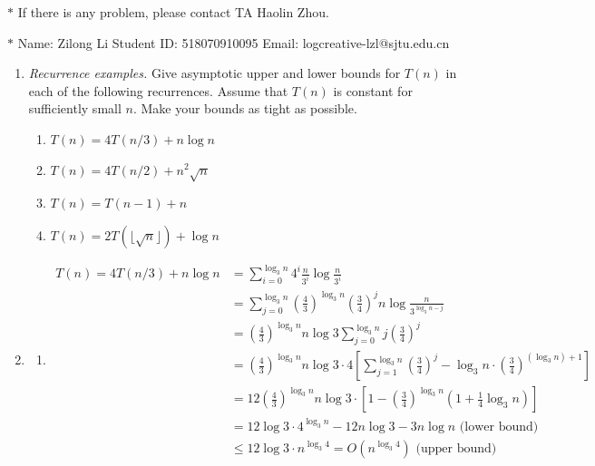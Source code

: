 \documentclass[12pt,a4paper]{article}
\makeatletter
\newtheorem*{solution}{Solution}
\theoremstyle{definition}
\renewenvironment{solution}[1][Solution] {\par\pushQED{\qed}\normalfont\topsep6\p@\@plus6\p@\relax\trivlist\item[\hskip\labelsep\bfseries#1\@addpunct{.}]\ignorespaces}{\popQED\endtrivlist\@endpefalse} \makeatother
\makeatother
\begin{document}
\noindent

\noindent{}
\begin{center}
\footnotesize{\color{red}$*$ If there is any problem, please contact TA Haolin Zhou. }

\footnotesize{\color{blue}$*$ Name: Zilong Li  \quad Student ID: 518070910095 \quad Email: logcreative-lzl@sjtu.edu.cn}
\end{center}

\begin{enumerate}
\item
    \textit{Recurrence examples.} Give asymptotic upper and lower bounds for $T(n)$ in each of the following recurrences. Assume that $T(n)$ is constant for sufficiently small $n$. Make your bounds as tight as possible.
\begin{enumerate}
	\item $T(n)=4 T(n / 3)+n \log n$
	\item $T(n)=4 T(n / 2)+n^{2} \sqrt{n}$
	\item $T(n)=T(n-1)+n$	
	\item $T(n)=2T(\lfloor \sqrt n\rfloor)+\log n$
\end{enumerate}
\begin{solution}
    \begin{enumerate}
        \item 
            \begin{align*}
                T(n) = 4 T(n / 3)+n \log n &= \sum_{i=0}^{\log_3 n}4^i \frac{n}{3^i}\log\frac{n}{3^i} \\&= \sum_{j=0}^{\log_3 n}\left(\frac{4}{3}\right)^{\log_3 n} \left(\frac{3}{4}\right)^j n\log\frac{n}{3^{\log_3 n-j}} \\
                &=\left(\frac{4}{3}\right)^{\log_3 n} n\log 3 \sum_{j=0}^{\log_3 n}j\left(\frac{3}{4}\right)^j \\
                &= \left(\frac{4}{3}\right)^{\log_3 n} n\log 3\cdot 4 \left[\sum_{j=1}^{\log_3 n}\left(\frac{3}{4}\right)^j - \log_3 n \cdot \left(\frac{3}{4}\right)^{(\log_3 n) +1}\right]\\
                &=12\left(\frac{4}{3}\right)^{\log_3 n} n\log 3 \cdot \left[1-\left(\frac{3}{4}\right)^{\log_3 n}\left(1+\frac{1}{4}\log_3 n \right)\right]\\
                &=12\log 3\cdot 4^{\log_3 n} - 12 n\log 3 - 3n\log n \text{ (lower bound)}\\
                &\leq 12\log 3\cdot n^{\log_3 4} = O(n^{\log_3 4}) \text{ (upper bound)}
            \end{align*}


\end{enumerate}
\end{solution}
\end{enumerate}
\end{document}

